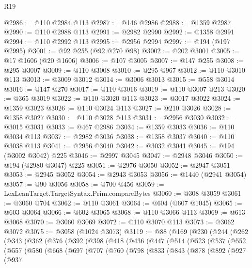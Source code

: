 \begin{lexlean}{R19}
\begin{coremodule}
@2986 := @110 @2984 @113
@2987 := @146 @2986
@2988 := @1359 @2987
@2990 := @110 @2988 @113
@2991 := @2982 @2990
@2992 := @1358 @2991
@2994 := @110 @2992 @113
@2995 := @2956 @2994
@2997 := @194 (@197 @2995)
@3001 := @92 @255 (@92 @270 @98)
@3002 := @202 @3001
@3005 := @17 @1606 (@20 @1606)
@3006 := @107 @3005
@3007 := @147 @255
@3008 := @295 @3007
@3009 := @110 @3008
@3010 := @295 @967
@3012 := @110 @3010 @113
@3013 := @3009 @3012
@3014 := @3006 @3013
@3015 := @558 @3014
@3016 := @147 @270
@3017 := @110 @3016
@3019 := @110 @3007 @213
@3020 := @365 @3019
@3022 := @110 @3020 @113
@3023 := @3017 @3022
@3024 := @1359 @3023
@3026 := @110 @3024 @113
@3027 := @210 @3026
@3028 := @1358 @3027
@3030 := @110 @3028 @113
@3031 := @2956 @3030
@3032 := @3015 @3031
@3033 := @467 @2986
@3034 := @1359 @3033
@3036 := @110 @3034 @113
@3037 := @2982 @3036
@3038 := @1358 @3037
@3040 := @110 @3038 @113
@3041 := @2956 @3040
@3042 := @3032 @3041
@3045 := @194 (@3002 @3042) @225
@3046 := @2997 @3045
@3047 := @2948 @3046
@3050 := @194 (@2980 @3047) @225
@3051 := @2976 @3050
@3052 := @2947 @3051
@3053 := @2945 @3052
@3054 := @2943 @3053
@3056 := @1440 (@2941 @3054)
@3057 := @90 @3056
@3058 := @700 @456
@3059 := LexLeanTarget.TargetSyntax.Prim.compareBytes
@3060 := @308 @3059
@3061 := @3060 @704
@3062 := @110 @3061
@3064 := @604 (@607 @1045)
@3065 := @603 @3064
@3066 := @602 @3065
@3068 := @110 @3066 @113
@3069 := @613 @3068
@3070 := @3060 @3069
@3072 := @110 @3070 @113
@3073 := @3062 @3072
@3075 := @3058 (@1024 @3073)
@3119 := @88
    (@169
      (@230
        (@244
          (@262
            (@343
              (@362
                (@376
                  (@392
                    (@398
                      (@418
                        (@436
                          (@447
                            (@514
                              (@523
                                (@537
                                  (@552
                                    (@557
                                      (@580
                                        (@668
                                          (@697
                                            (@707
                                              (@760
                                                (@798
                                                  (@833
                                                    (@843
                                                      (@878
                                                        (@892
                                                          (@927
                                                            (@937

\end{coremodule}
\end{lexlean}

